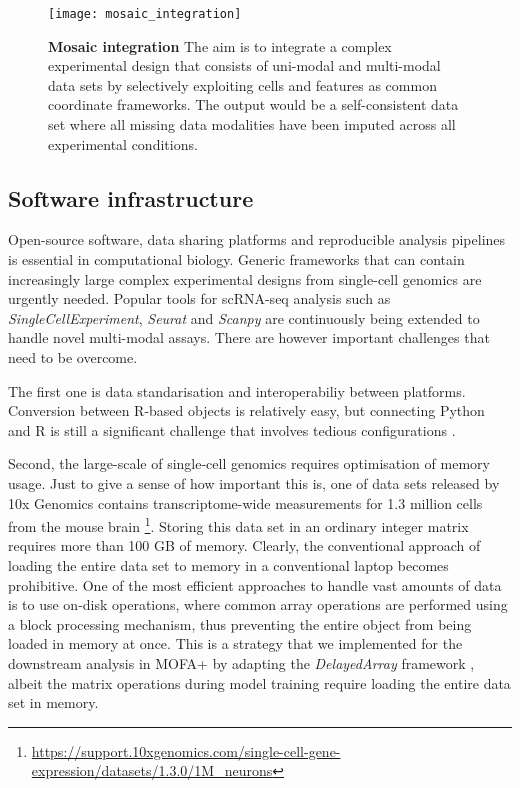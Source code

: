\begin{figure}[H]
	\centering
	\texttt{[image: mosaic\_integration]}
	\caption[]{
	\textbf{Mosaic integration} The aim is to integrate a complex experimental design that consists of uni-modal and multi-modal data sets by selectively exploiting cells and features as common coordinate frameworks. The output would be a self-consistent data set where all missing data modalities have been imputed across all experimental conditions.}
	\label{fig:mosaic_integration}
\end{figure}


\subsection{Software infrastructure} 

Open-source software, data sharing platforms and reproducible analysis pipelines is essential in computational biology. Generic frameworks that can contain increasingly large complex experimental designs from single-cell genomics are urgently needed. Popular tools for scRNA-seq analysis such as \textit{SingleCellExperiment}, \textit{Seurat} and \textit{Scanpy} are continuously being extended to handle novel multi-modal assays. There are however important challenges that need to be overcome. 

The first one is data standarisation and interoperabiliy between platforms. Conversion between R-based objects is relatively easy, but connecting Python and R is still a significant challenge that involves tedious configurations \cite{reticulate}. 

Second, the large-scale of single-cell genomics requires optimisation of memory usage. Just to give a sense of how important this is, one of data sets released by 10x Genomics contains transcriptome-wide measurements for 1.3 million cells from the mouse brain \footnote{\url{https://support.10xgenomics.com/single-cell-gene-expression/datasets/1.3.0/1M_neurons}}. Storing this data set in an ordinary integer matrix requires more than 100 GB of memory. Clearly, the conventional approach of loading the entire data set to memory in a conventional laptop becomes prohibitive. One of the most efficient approaches to handle vast amounts of data is to use on-disk operations, where common array operations are performed using a block processing mechanism, thus preventing the entire object from being loaded in memory at once. This is a strategy that we implemented for the downstream analysis in MOFA+ by adapting the \textit{DelayedArray} framework \cite{Herve2020}, albeit the matrix operations during model training require loading the entire data set in memory. 

